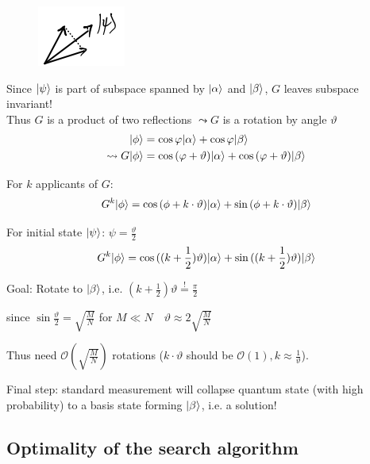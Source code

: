 \begin{figure}[H]
    \centering
    \includegraphics[scale=0.5]{chapters/res/psi-reflection-diagram.png}
\end{figure}

Since $\lvert\psi\rangle$ is part of subspace spanned by $\lvert\alpha\rangle$ and $\lvert\beta\rangle$, 
$G$ leaves subspace invariant! \\
Thus $G$ is a product of two reflections $\leadsto G$ is a rotation by angle 
$\vartheta$
\begin{align}
    \lvert\phi\rangle &= \cos{\varphi} \lvert\alpha\rangle + \cos{\varphi} \lvert\beta\rangle \\
    \leadsto G \lvert\phi\rangle &= \cos{(\varphi + \vartheta)} \lvert\alpha\rangle + \cos{(\varphi + \vartheta)} \lvert\beta\rangle
\end{align}


For $k$ applicants of $G$:
\begin{equation}
    G^k \lvert\phi\rangle = \cos{(\phi + k \cdot \vartheta)} \lvert\alpha\rangle 
        + \sin{(\phi + k \cdot \vartheta)} \lvert\beta\rangle
\end{equation}

For initial state $\lvert\psi\rangle$: $\psi = \frac{\vartheta}{2}$
\begin{equation}
    G^k \lvert\phi\rangle = \cos{((k + \frac{1}{2}) \vartheta)} \lvert\alpha\rangle 
        + \sin{((k + \frac{1}{2}) \vartheta)} \lvert\beta\rangle
\end{equation}

Goal: Rotate to $\lvert\beta\rangle$, i.e. $(k + \frac{1}{2}) \vartheta \stackrel{!}{=} \frac{\pi}{2}$

since $\sin{\frac{\vartheta}{2}} = \sqrt{\frac{M}{N}}$ for $M \ll N \quad \vartheta \approx 2 \sqrt{\frac{M}{N}}$

Thus need $\mathcal{O}(\sqrt{\frac{M}{N}})$ rotations 
($k \cdot \vartheta$ should be $\mathcal{O}(1), k \approx \frac{1}{\vartheta}$).

Final step: standard measurement will collapse quantum state (with high probability)
to a basis state forming $\lvert\beta\rangle$, i.e. a solution!


\subsection{Optimality of the search algorithm}

